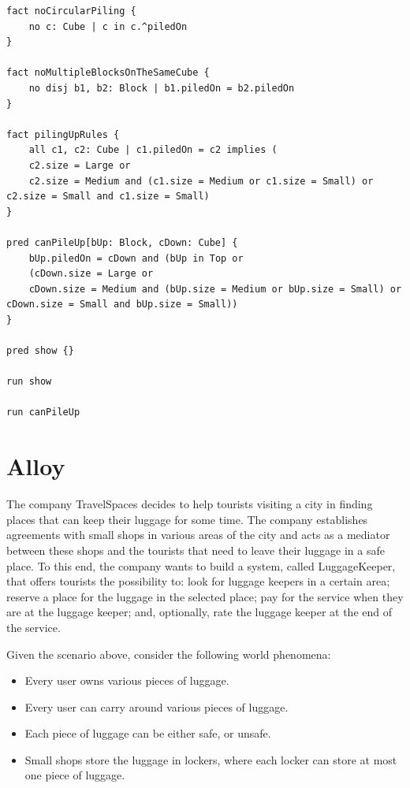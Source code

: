 \documentclass[12pt, a4paper]{report}
\newtheorem[style=M,bodystyle=\normalfont]{theorem}{Theorem}
\newtheorem[style=M,bodystyle=\normalfont]{corollary}{Corollary}
\newtheorem[style=M,bodystyle=\normalfont]{lemma}{Lemma}
\newtheorem[style=M,bodystyle=\normalfont]{definition}{Definition}
\begin{document}
\begin{enumerate}
\begin{lstlisting}[language=alloy]
fact noCircularPiling {
    no c: Cube | c in c.^piledOn
}

fact noMultipleBlocksOnTheSameCube {
    no disj b1, b2: Block | b1.piledOn = b2.piledOn
}

fact pilingUpRules {
    all c1, c2: Cube | c1.piledOn = c2 implies (
    c2.size = Large or
    c2.size = Medium and (c1.size = Medium or c1.size = Small) or c2.size = Small and c1.size = Small)
}

pred canPileUp[bUp: Block, cDown: Cube] {
    bUp.piledOn = cDown and (bUp in Top or
    (cDown.size = Large or
    cDown.size = Medium and (bUp.size = Medium or bUp.size = Small) or cDown.size = Small and bUp.size = Small))
}   

pred show {} 

run show

run canPileUp 
            \end{lstlisting}
    \end{enumerate}

    \section{Alloy}
        The company TravelSpaces decides to help tourists visiting a city in finding places that can keep their luggage 
        for some time. The company establishes agreements with small shops in various areas of the city and 
        acts as a mediator between these shops and the tourists that need to leave their luggage in a safe
        place. To this end, the company wants to build a system, called LuggageKeeper, that offers tourists 
        the possibility to: look for luggage keepers in a certain area; reserve a place for the luggage in 
        the selected place; pay for the service when they are at the luggage keeper; and, optionally, rate 
        the luggage keeper at the end of the service.
        
        Given the scenario above, consider the following world phenomena:
        \begin{itemize}
            \item Every user owns various pieces of luggage.
            \item Every user can carry around various pieces of luggage.
            \item Each piece of luggage can be either safe, or unsafe.
            \item Small shops store the luggage in lockers, where each locker can store at most one piece of luggage. 
        \end{itemize}
        
\end{document}

